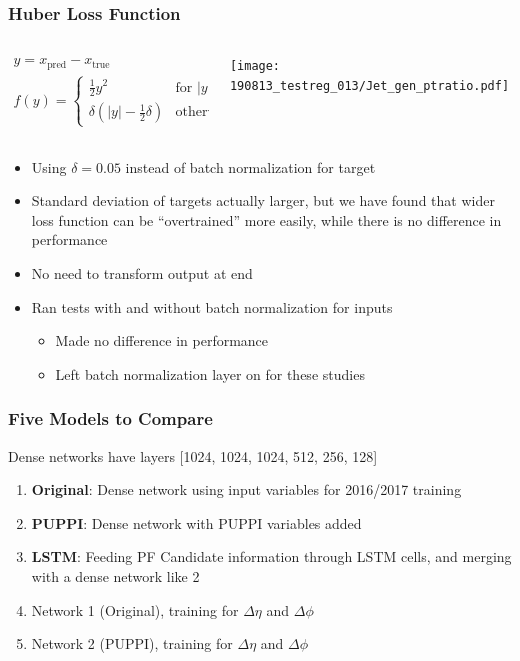\documentclass{beamer}
\begin{document}
\begin{frame}
  \frametitle{Huber Loss Function}

  \begin{columns}
    \begin{column}{0.5\linewidth}
      \begin{gather*}
        y = x_\mathrm{pred} - x_\mathrm{true} \\
        f(y) = \begin{cases}
          \frac12 y^2 & \mbox{for } |y| < \delta \\
          \delta(|y| - \frac12 \delta) & \mbox{otherwise}
        \end{cases}
      \end{gather*}
    \end{column}
    \begin{column}{0.5\linewidth}
      \texttt{[image: 190813\_testreg\_013/Jet\_gen\_ptratio.pdf]}
    \end{column}
  \end{columns}

  \begin{itemize}
  \item Using $\delta = 0.05$ instead of batch normalization for target
  \item Standard deviation of targets actually larger, but
    we have found that wider loss function can be ``overtrained''
    more easily, while there is no difference in performance
  \item No need to transform output at end
  \item Ran tests with and without batch normalization for inputs
    \begin{itemize}
    \item Made no difference in performance
    \item Left batch normalization layer on for these studies
    \end{itemize}
  \end{itemize}

\end{frame}

\begin{frame}
  \frametitle{Five Models to Compare}

  Dense networks have layers [1024, 1024, 1024, 512, 256, 128]

  \begin{enumerate}
  \item {\bf Original}: Dense network using input variables for 2016/2017 training
  \item {\bf PUPPI}: Dense network with PUPPI variables added
  \item {\bf LSTM}: Feeding PF Candidate information through LSTM cells,
    and merging with a dense network like 2
  \item Network 1 (Original), training for $\Delta \eta$ and $\Delta \phi$
  \item Network 2 (PUPPI), training for $\Delta \eta$ and $\Delta \phi$
  \end{enumerate}

\end{frame}
\end{document}
